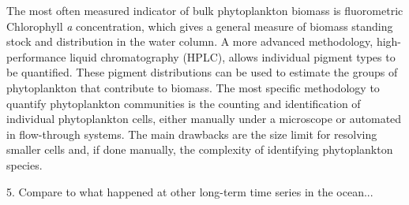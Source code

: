     The most often measured indicator of bulk phytoplankton biomass is fluorometric Chlorophyll \textit{a} concentration, which gives a general measure of biomass standing stock and distribution in the water column. A more advanced methodology, high-performance liquid chromatography (HPLC), allows individual pigment types to be quantified. These pigment distributions can be used to estimate the groups of phytoplankton that contribute to biomass. The most specific methodology to quantify phytoplankton communities is the counting and identification of individual phytoplankton cells, either manually under a microscope or automated in flow-through systems. The main drawbacks are the size limit for resolving smaller cells and, if done manually, the complexity of identifying phytoplankton species. 








    


5. Compare to what happened at other long-term time series in the ocean...







